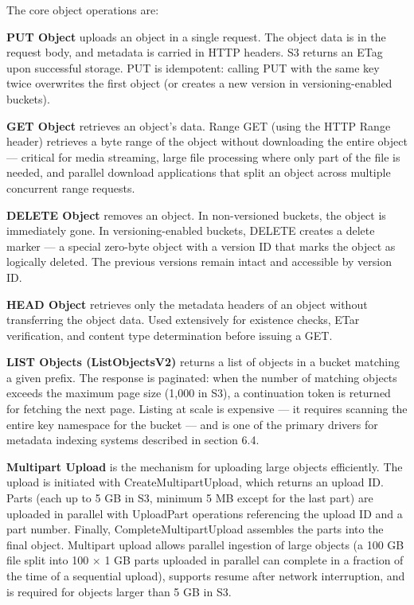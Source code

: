 The core object operations are:

\textbf{PUT Object} uploads an object in a single request. The object data is in the request body, and metadata is carried in HTTP headers. S3 returns an ETag upon successful storage. PUT is idempotent: calling PUT with the same key twice overwrites the first object (or creates a new version in versioning-enabled buckets).

\textbf{GET Object} retrieves an object's data. Range GET (using the HTTP Range header) retrieves a byte range of the object without downloading the entire object --- critical for media streaming, large file processing where only part of the file is needed, and parallel download applications that split an object across multiple concurrent range requests.

\textbf{DELETE Object} removes an object. In non-versioned buckets, the object is immediately gone. In versioning-enabled buckets, DELETE creates a delete marker --- a special zero-byte object with a version ID that marks the object as logically deleted. The previous versions remain intact and accessible by version ID.

\textbf{HEAD Object} retrieves only the metadata headers of an object without transferring the object data. Used extensively for existence checks, ETar verification, and content type determination before issuing a GET.

\textbf{LIST Objects (ListObjectsV2)} returns a list of objects in a bucket matching a given prefix. The response is paginated: when the number of matching objects exceeds the maximum page size (1,000 in S3), a continuation token is returned for fetching the next page. Listing at scale is expensive --- it requires scanning the entire key namespace for the bucket --- and is one of the primary drivers for metadata indexing systems described in section 6.4.

\textbf{Multipart Upload} is the mechanism for uploading large objects efficiently. The upload is initiated with CreateMultipartUpload, which returns an upload ID. Parts (each up to 5 GB in S3, minimum 5 MB except for the last part) are uploaded in parallel with UploadPart operations referencing the upload ID and a part number. Finally, CompleteMultipartUpload assembles the parts into the final object. Multipart upload allows parallel ingestion of large objects (a 100 GB file split into 100 $\times$ 1 GB parts uploaded in parallel can complete in a fraction of the time of a sequential upload), supports resume after network interruption, and is required for objects larger than 5 GB in S3.


